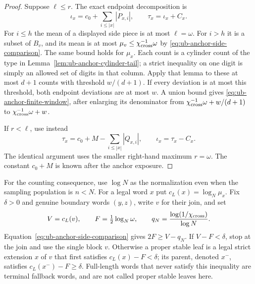 \documentclass[11pt]{article}
\numberwithin{equation}{section}
\newcommand{\1}{\mathbf 1}
\begin{document}
\begin{proof}
Suppose $\ell\le r$.  The exact endpoint decomposition is
\[
 \iota_x=c_0+\sum_{i\le|x|}|P_{x,i}|,
 \qquad \tau_x=\iota_x+C_x.
\]
For $i\le h$ the mean of a displayed side piece is at most
$\ell=\omega$.  For $i>h$ it is a subset of $B_v$, and its mean
is at most $\mu_v\le\chi_{\rm cross}^{-1}\omega$ by
\eqref{eq:ub-anchor-side-comparison}.  The same bound holds for
$\mu_x$.  Each count is a cylinder count of the type in
Lemma~\ref{lem:ub-anchor-cylinder-tail}; a strict inequality on one
digit is simply an allowed set of digits in that column.
Apply that lemma to these at most $d+1$ counts with threshold
$w/(d+1)$.  If every deviation is at most this threshold, both
endpoint deviations are at most $w$.  A union bound gives
\eqref{eq:ub-anchor-finite-window}, after enlarging its denominator
from $\chi_{\rm cross}^{-1}\omega+w/(d+1)$ to
$\chi_{\rm cross}^{-1}\omega+w$.

If $r<\ell$, use instead
\[
 \tau_x=c_0+M-\sum_{i\le|x|}|Q_{x,i}|,
 \qquad \iota_x=\tau_x-C_x.
\]
The identical argument uses the smaller right-hand maximum
$r=\omega$.  The constant $c_0+M$ is known after the anchor exposure.
\end{proof}

For the counting consequence, use $\log N$ as the normalization even
when the sampling population is $n<N$.  For a legal word $x$ put
$c_L(x)=\log_N\mu_x$.  Fix $\delta>0$ and genuine boundary words
$(y,z)$, write $v$ for their join, and set
\begin{equation}
\label{eq:ub-anchor-normalized-scales}
  V=c_L(v),\qquad F=\tfrac12\log_N\omega,\qquad
  q_N=\frac{\log(1/\chi_{\rm cross})}{\log N}.
\end{equation}
Equation~\eqref{eq:ub-anchor-side-comparison} gives
$2F\ge V-q_N$.  If $V-F<\delta$, stop at the join and use the
single block $v$.  Otherwise a proper stable leaf is a legal strict
extension $x$ of $v$ that first satisfies $c_L(x)-F<\delta$;
its parent, denoted $x^-$, satisfies $c_L(x^-)-F\ge\delta$.
Full-length words that never satisfy this inequality are terminal
fallback words, and are not called proper stable leaves here.
\end{document}
